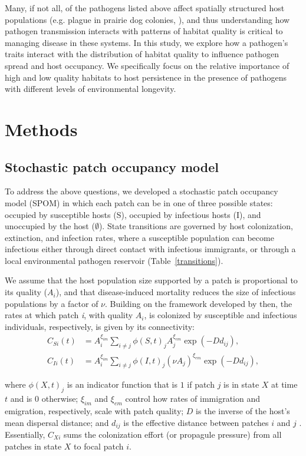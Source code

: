 \documentclass{article}
\begin{document}
Many, if not all, of the pathogens listed above affect spatially structured host populations (e.g. plague in prairie dog colonies, \cite{George2013}), and thus understanding how pathogen transmission interacts with patterns of habitat quality is critical to managing disease in these systems.  In this study, we explore how a pathogen's traits interact with the distribution of habitat quality to influence pathogen spread and host occupancy.  We specifically focus on the relative importance of high and low quality habitats to host persistence in the presence of pathogens with different levels of environmental longevity. 

\section{Methods}
\label{methods}

\subsection{Stochastic patch occupancy model}


To address the above questions, we developed a stochastic patch occupancy model (SPOM) in which each patch can be in one of three possible states: occupied by susceptible hosts (S), occupied by infectious hosts (I), and unoccupied by the host ($\emptyset$).  State transitions are governed by host colonization, extinction, and infection rates, where a susceptible population can become infectious either through direct contact with infectious immigrants, or through a local environmental pathogen reservoir (Table~\ref{transitions}).

We assume that the host population size supported by a patch is proportional to its quality ($A_i$), and that disease-induced mortality reduces the size of infectious populations by a factor of $\nu$.  Building on the framework developed by \cite{Hanski2003} then, the rates at which patch \emph{i}, with quality $A_i$, is colonized by susceptible and infectious individuals, respectively, is given by its connectivity:
\begin{align}
C_{Si}(t) &= A_i^{\xi_{im}} \sum_{i\neq j }\phi(S, t)_jA_j^{\xi_{em}}\exp(-D d_{ij}),\\
C_{Ii}(t) &= A_i^{\xi_{im}} \sum_{i\neq j }\phi(I, t)_j(\nu A_j) ^{\xi_{em}}\exp(-D d_{ij}),
\label{connectivity}
\end{align}

where $\phi(X, t)_j$ is an indicator function that is $1$ if patch $j$ is in state $X$ at time $t$ and is $0$ otherwise; $\xi_{im}$ and $\xi_{em}$ control how rates of immigration and emigration, respectively, scale with patch quality; $D$ is the inverse of the host's mean dispersal distance; and $d_{ij}$ is the effective distance between patches $i$ and $j$ .  Essentially, $C_{Xi}$ sums the colonization effort (or propagule pressure) from all patches in state $X$ to focal patch $i$.  
\end{document}
